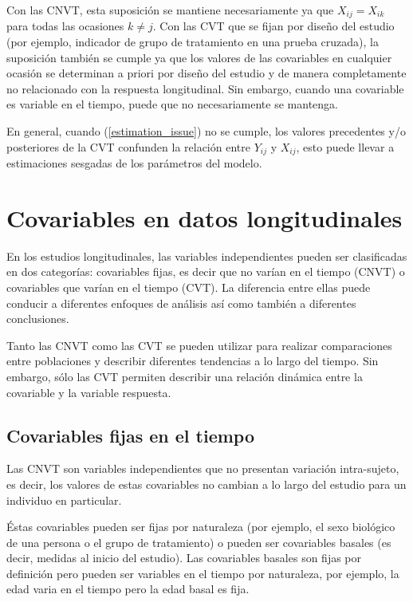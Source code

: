 \documentclass[spanish]{article}
\numberwithin{figure}{subsection}
\numberwithin{equation}{subsection}
\numberwithin{table}{subsection}
\begin{document}
Con las CNVT, esta suposición se mantiene necesariamente ya que $X_{ij} =
X_{ik}$ para todas las ocasiones $k \neq j$. Con las CVT que se fijan por diseño
del estudio (por ejemplo, indicador de grupo de tratamiento en una prueba
cruzada), la suposición también se cumple ya que los valores de las covariables
en cualquier ocasión se determinan a priori por diseño del estudio y de manera
completamente no relacionado con la respuesta longitudinal. Sin embargo, cuando
una covariable es variable en el tiempo, puede que no necesariamente se
mantenga.

En general, cuando (\ref{estimation_issue}) no se cumple, los valores
precedentes y/o posteriores de la CVT confunden la relación entre $Y_{ij}$ y
$X_{ij}$, esto puede llevar a estimaciones sesgadas de los parámetros del
modelo.

\newpage

\section{Covariables en datos longitudinales}


En los estudios longitudinales, las variables independientes pueden ser
clasificadas en dos categorías: covariables fijas, es decir que no varían en el
tiempo (CNVT) o covariables que varían en el tiempo (CVT). La diferencia entre
ellas puede conducir a diferentes enfoques de análisis así como también a
diferentes conclusiones.

Tanto las CNVT como las CVT se pueden utilizar para realizar comparaciones entre
poblaciones y describir diferentes tendencias a lo largo del tiempo. Sin
embargo, sólo las CVT permiten describir una relación dinámica entre la
covariable y la variable respuesta.

\subsection{Covariables fijas en el tiempo}

Las CNVT son variables independientes que no presentan variación intra-sujeto,
es decir, los valores de estas covariables no cambian a lo largo del estudio
para un individuo en particular.

Éstas covariables pueden ser fijas por naturaleza (por ejemplo, el sexo
biológico de una persona o el grupo de tratamiento) o pueden ser covariables
basales (es decir, medidas al inicio del estudio). Las covariables basales son
fijas por definición pero pueden ser variables en el tiempo por naturaleza, por
ejemplo, la edad varia en el tiempo pero la edad basal es fija.
\end{document}
